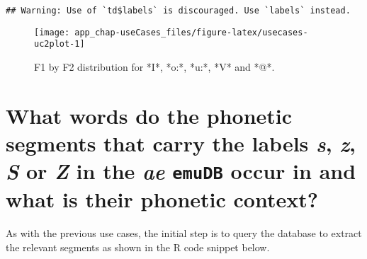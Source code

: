 \documentclass[
]{book}
\newenvironment{Shaded}{\begin{snugshade}}{\end{snugshade}}
\newcommand{\AttributeTok}[1]{\textcolor[rgb]{0.77,0.63,0.00}{#1}}
\newcommand{\CommentTok}[1]{\textcolor[rgb]{0.56,0.35,0.01}{\textit{#1}}}
\newcommand{\ConstantTok}[1]{\textcolor[rgb]{0.00,0.00,0.00}{#1}}
\newcommand{\FunctionTok}[1]{\textcolor[rgb]{0.00,0.00,0.00}{#1}}
\newcommand{\NormalTok}[1]{#1}
\newcommand{\SpecialCharTok}[1]{\textcolor[rgb]{0.00,0.00,0.00}{#1}}
\newcommand{\StringTok}[1]{\textcolor[rgb]{0.31,0.60,0.02}{#1}}
\begin{document}
\begin{Shaded}
\end{Shaded}

\begin{verbatim}
## Warning: Use of `td$labels` is discouraged. Use `labels` instead.
\end{verbatim}

\begin{figure}

{\centering \texttt{[image: app\_chap-useCases\_files/figure-latex/usecases-uc2plot-1]} 

}

\caption{F1 by F2 distribution for *I*, *o:*, *u:*, *V* and *@*.}\label{fig:usecases-uc2plot}
\end{figure}

\hypertarget{sec:app-chap-useCases-q3}{%
\section{\texorpdfstring{What words do the phonetic segments that carry the labels \emph{s}, \emph{z}, \emph{S} or \emph{Z} in the \emph{ae} \texttt{emuDB} occur in and what is their phonetic context?}{What words do the phonetic segments that carry the labels s, z, S or Z in the ae emuDB occur in and what is their phonetic context?}}\label{sec:app-chap-useCases-q3}}

As with the previous use cases, the initial step is to query the database to extract the relevant segments as shown in the R code snippet below.
\end{document}
